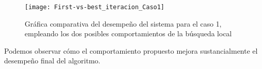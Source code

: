 \begin{figure}
	\centering
	\texttt{[image: First-vs-best\_iteracion\_Caso1]}
	\caption{Gráfica comparativa del desempeño del sistema para el caso 1, empleando los dos posibles comportamientos de la búsqueda local}
	\label{fig:5:first-vs-bestiteracioncaso1}
\end{figure}

Podemos observar cómo el comportamiento propuesto mejora sustancialmente el desempeño final del algoritmo.